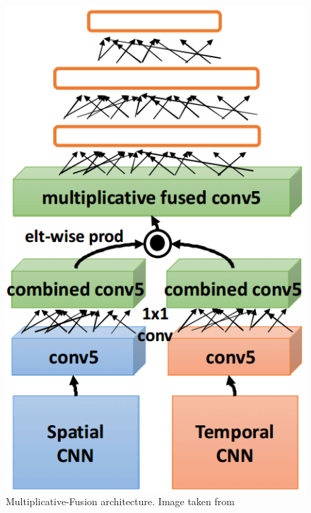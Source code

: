 \documentclass[../main.tex]{subfiles}
\begin{document}
    \begin{figure}[h!]
        \centering{}
        \includegraphics[width=.5\linewidth]{./img/multfusion.png}
        \caption{Multiplicative-Fusion architecture. Image taken from~\cite{multfusion}}\label{fig:multfusion}
    \end{figure}
\end{document}
